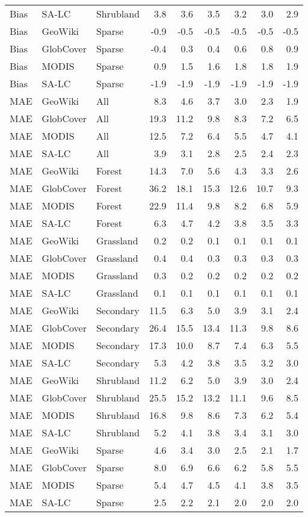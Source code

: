 \begin{longtable}{lllrrrrrr}
  Bias & SA-LC & Shrubland & 3.8 & 3.6 & 3.5 & 3.2 & 3.0 & 2.9 \\ 
  Bias & GeoWiki & Sparse & -0.9 & -0.5 & -0.5 & -0.5 & -0.5 & -0.5 \\ 
  Bias & GlobCover & Sparse & -0.4 & 0.3 & 0.4 & 0.6 & 0.8 & 0.9 \\ 
  Bias & MODIS & Sparse & 0.9 & 1.5 & 1.6 & 1.8 & 1.8 & 1.9 \\ 
  Bias & SA-LC & Sparse & -1.9 & -1.9 & -1.9 & -1.9 & -1.9 & -1.9 \\ 
  MAE & GeoWiki & All & 8.3 & 4.6 & 3.7 & 3.0 & 2.3 & 1.9 \\ 
  MAE & GlobCover & All & 19.3 & 11.2 & 9.8 & 8.3 & 7.2 & 6.5 \\ 
  MAE & MODIS & All & 12.5 & 7.2 & 6.4 & 5.5 & 4.7 & 4.1 \\ 
  MAE & SA-LC & All & 3.9 & 3.1 & 2.8 & 2.5 & 2.4 & 2.3 \\ 
  MAE & GeoWiki & Forest & 14.3 & 7.0 & 5.6 & 4.3 & 3.3 & 2.6 \\ 
  MAE & GlobCover & Forest & 36.2 & 18.1 & 15.3 & 12.6 & 10.7 & 9.3 \\ 
  MAE & MODIS & Forest & 22.9 & 11.4 & 9.8 & 8.2 & 6.8 & 5.9 \\ 
  MAE & SA-LC & Forest & 6.3 & 4.7 & 4.2 & 3.8 & 3.5 & 3.3 \\ 
  MAE & GeoWiki & Grassland & 0.2 & 0.2 & 0.1 & 0.1 & 0.1 & 0.1 \\ 
  MAE & GlobCover & Grassland & 0.4 & 0.4 & 0.3 & 0.3 & 0.3 & 0.3 \\ 
  MAE & MODIS & Grassland & 0.3 & 0.2 & 0.2 & 0.2 & 0.2 & 0.2 \\ 
  MAE & SA-LC & Grassland & 0.1 & 0.1 & 0.1 & 0.1 & 0.1 & 0.1 \\ 
  MAE & GeoWiki & Secondary & 11.5 & 6.3 & 5.0 & 3.9 & 3.1 & 2.4 \\ 
  MAE & GlobCover & Secondary & 26.4 & 15.5 & 13.4 & 11.3 & 9.8 & 8.6 \\ 
  MAE & MODIS & Secondary & 17.3 & 10.0 & 8.7 & 7.4 & 6.3 & 5.5 \\ 
  MAE & SA-LC & Secondary & 5.3 & 4.2 & 3.8 & 3.5 & 3.2 & 3.0 \\ 
  MAE & GeoWiki & Shrubland & 11.2 & 6.2 & 5.0 & 3.9 & 3.0 & 2.4 \\ 
  MAE & GlobCover & Shrubland & 25.5 & 15.2 & 13.2 & 11.1 & 9.6 & 8.5 \\ 
  MAE & MODIS & Shrubland & 16.8 & 9.8 & 8.6 & 7.3 & 6.2 & 5.4 \\ 
  MAE & SA-LC & Shrubland & 5.2 & 4.1 & 3.8 & 3.4 & 3.1 & 3.0 \\ 
  MAE & GeoWiki & Sparse & 4.6 & 3.4 & 3.0 & 2.5 & 2.1 & 1.7 \\ 
  MAE & GlobCover & Sparse & 8.0 & 6.9 & 6.6 & 6.2 & 5.8 & 5.5 \\ 
  MAE & MODIS & Sparse & 5.4 & 4.7 & 4.5 & 4.1 & 3.8 & 3.5 \\ 
  MAE & SA-LC & Sparse & 2.5 & 2.2 & 2.1 & 2.0 & 2.0 & 2.0 \\ 
   \hline
\hline
\end{longtable}
